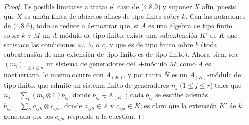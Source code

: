 \begin{proof}
Es posible limitarse a tratar el caso de (4.8.9) y suponer $X$ afín, puesto que
$X$ es unión finita de abiertos afines de tipo finito sobre $k$. Con las
notaciones de (4.8.6), todo se reduce a demostrar que, si $A$ es una álgebra de
tipo finito sobre $k$ y $M$ un $A$-módulo de tipo finito, existe una
subextensión $K'$ de $K$ que satisface las condiciones \emph{a)}, \emph{b)} o \emph{c)} y que es de
tipo finito sobre $k$ (toda subextensión de una extensión de tipo finito es de
tipo finito). Ahora bien, sea $(m_i)_{1\leq i\leq n}$ un sistema de generadores
del $A$-módulo $M$; como $A$ es noetheriano, lo mismo ocurre con $A_{(K)}$, y
por tanto $\overline N$ es un $A_{(K)}$-módulo de tipo finito, que admite un
sistema finito de generadores $n_j$ ($1\leq j\leq r$) tales que
$n_j=\sum_i(m_i\otimes1)b_{ij}$,
donde $b_{ij}\in A_{(K)}$;
cada $b_{ij}$ se escribe además
$b_{ij}=\sum_h a_{ijh}\otimes c_{ijh}$,
donde $a_{ijh}\in A$ y $c_{ijh}\in K$;
es claro que la extensión $K'$ de $k$ generada por los $c_{ijh}$ responde a
la cuestión.
\end{proof}

